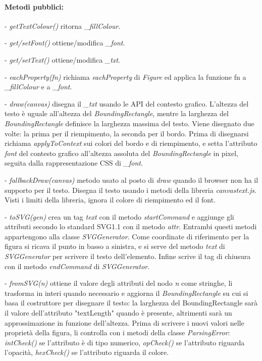 \paragraph{Metodi pubblici:}
\begin{elencopuntato}[\subsubsecindent]
\item[-] \textit{getTextColour()} ritorna \textit{{\_}fillColour}.
\item[-] \textit{get/setFont()} ottiene/modifica \textit{{\_}font}.
\item[-] \textit{get/setText()} ottiene/modifica \textit{{\_}txt}.
\item[-] \textit{eachProperty(fn)} richiama \textit{eachProperty} di \textit{Figure} ed applica la funzione fn a \textit{{\_}fillColour} e a \textit{{\_}font}.
\item[-] \textit{draw(canvas)} disegna il \textit{{\_}txt} usando le API del contesto grafico. L'altezza del testo \`e uguale all'altezza del \textit{BoundingRectangle}, mentre la larghezza del \textit{BoundingRectangle} definisce la larghezza massima del testo. Viene disegnato due volte: la prima per il riempimento, la seconda per il bordo. Prima di disegnarsi richiama \textit{applyToContext} sui colori del bordo e di riempimento, e setta l'attributo \textit{font} del contesto grafico all'altezza assoluta del \textit{BoundingRectangle} in pixel, seguita dalla rappresentazione CSS di \textit{{\_}font}.
\item[-] \textit{fallbackDraw(canvas)} metodo usato al posto di \textit{draw} quando il browser non ha il supporto per il testo. Disegna il testo usando i metodi della libreria \textit{canvastext.js}. Visti i limiti della libreria, ignora il colore di riempimento ed il font.
\item[-] \textit{toSVG(gen)} crea un tag \textit{text} con il metodo \textit{startCommand} e aggiunge gli attributi secondo lo standard SVG1.1 con il metodo \textit{attr}. Entrambi questi metodi appartengono alla classe \textit{SVGGenerator}. Come coordinate di riferimento per la figura si ricava il punto in basso a sinistra, e si serve del metodo \textit{text} di \textit{SVGGenerator} per scrivere il testo dell'elemento. Infine scrive il tag di chiusura con il metodo \textit{endCommand} di \textit{SVGGenerator}.
\item[-] \textit{fromSVG(n)} ottiene il valore degli attributi del nodo \textit{n} come stringhe, li trasforma in interi quando necessario e aggiorna il \textit{BoundingRectangle} su cui si basa il costruttore per disegnare il testo: la larghezza del BoundingRectangle sar\`a il valore dell'attributo "textLength" quando \`e presente, altrimenti sar\`a un approssimazione in funzione dell'altezza. Prima di scrivere i nuovi valori nelle propriet\`a della figura, li controlla con i metodi della classe \textit{ParsingError}: \textit{intCheck()} se l'attributo \`e di tipo numerico, \textit{opCheck()} se l'attributo riguarda l'opacit\`a, \textit{hexCheck()} se l'attributo riguarda il colore.
\end{elencopuntato}

